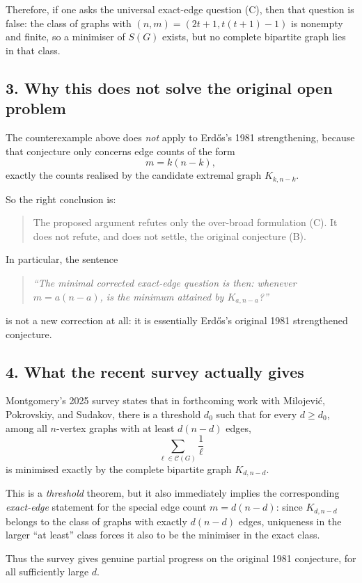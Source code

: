 Therefore, if one asks the universal exact-edge question (C), then that question is false: the class of graphs with $(n,m)=(2t+1,t(t+1)-1)$ is nonempty and finite, so a minimiser of $S(G)$ exists, but no complete bipartite graph lies in that class.

\subsection*{3. Why this does not solve the original open problem}

The counterexample above does \emph{not} apply to Erd\H{o}s's 1981 strengthening, because that conjecture only concerns edge counts of the form
\[
m=k(n-k),
\]
exactly the counts realised by the candidate extremal graph $K_{k,n-k}$.

So the right conclusion is:
\begin{quote}
The proposed argument refutes only the over-broad formulation (C). It does not refute, and does not settle, the original conjecture (B).
\end{quote}

In particular, the sentence
\begin{quote}
\emph{``The minimal corrected exact-edge question is then: whenever $m=a(n-a)$, is the minimum attained by $K_{a,n-a}$?''}
\end{quote}
is not a new correction at all: it is essentially Erd\H{o}s's original 1981 strengthened conjecture.

\subsection*{4. What the recent survey actually gives}

Montgomery's 2025 survey states that in forthcoming work with Milojevi\'c, Pokrovskiy, and Sudakov, there is a threshold $d_0$ such that for every $d\ge d_0$, among all $n$-vertex graphs with at least $d(n-d)$ edges,
\[
\sum_{\ell\in \mathcal C(G)} \frac1\ell
\]
is minimised exactly by the complete bipartite graph $K_{d,n-d}$.

This is a \emph{threshold} theorem, but it also immediately implies the corresponding \emph{exact-edge} statement for the special edge count $m=d(n-d)$: since $K_{d,n-d}$ belongs to the class of graphs with exactly $d(n-d)$ edges, uniqueness in the larger ``at least'' class forces it also to be the minimiser in the exact class.

Thus the survey gives genuine partial progress on the original 1981 conjecture, for all sufficiently large $d$.

